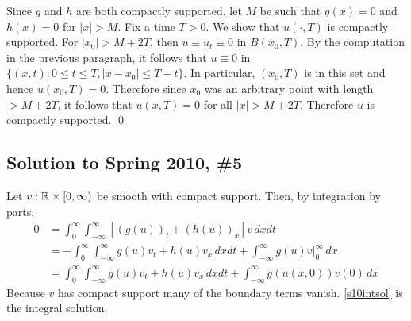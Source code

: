 Since $g$ and $h$ are both compactly supported, let $M$ be such that $g(x) = 0$ and $h(x) = 0$
for $|x| > M$. Fix a time $T > 0$. We show that $u(\cdot, T)$ is compactly supported.
For $|x_{0}| > M + 2T$, then $u \equiv u_{t} \equiv 0$ in $B(x_{0}, T)$. By the computation
in the previous paragraph, it follows that $u \equiv 0$ in $\{(x, t) : 0 \leq t \leq T, |x - x_{0}| \leq T - t\}$. In particular, $(x_{0}, T)$ is in this set and hence $u(x_{0}, T) = 0$.
Therefore since $x_{0}$ was an arbitrary point with length $> M + 2T$, it follows
that $u(x, T) = 0$ for all $|x| > M + 2T$. Therefore $u$ is compactly supported.
\hfill\qed

\subsection*{Solution to Spring 2010, \#5}\label{s105}
Let $v : \mathbb{R} \times [0,\infty)$ be smooth with compact support. Then, by integration by parts,
\begin{align}
\nonumber 0 &= \int_0^{\infty} \int_{-\infty}^{\infty} [(g(u))_t + (h(u))_x] v \, dx dt \\
\nonumber &= -\int_0^{\infty} \int_{-\infty}^{\infty} g(u)v_t + h(u)v_x \, dx dt + \int_{-\infty}^{\infty} g(u)v \Bigr\rvert_{0}^{\infty} \, dx \\
\label{s10intsol} &= \int_0^{\infty} \int_{-\infty}^{\infty} g(u)v_t + h(u)v_x \, dx dt + \int_{-\infty}^{\infty} g(u(x,0))v(0) \, dx
\end{align}
Because $v$ has compact support many of the boundary terms vanish. \eqref{s10intsol} is the integral solution.

\vspace{0.4cm}

